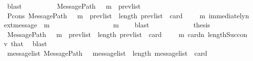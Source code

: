 \begin{isabellebody}
\ blast\isanewline
\ \ \ \ \ \ \ \ \isamarkupfalse%
\ {\isachardoublequoteopen}MessagePath\ {\isasymsigma}\ {\isasymsigma}{\isacharprime}\ {\isacharparenleft}m\ {\isacharhash}\ prev{\isacharunderscore}list{\isacharparenright}{\isachardoublequoteclose}\isanewline
\ \ \ \ \ \ \ \ \ \ \isamarkupfalse%
\ P{\isacharunderscore}cons\ {\isacartoucheopen}MessagePath\ {\isacharparenleft}{\isasymsigma}\ {\isasymunion}\ {\isacharbraceleft}m{\isacharbraceright}{\isacharparenright}\ {\isasymsigma}{\isacharprime}\ prev{\isacharunderscore}list\ {\isasymand}\ length\ prev{\isacharunderscore}list\ {\isacharequal}\ card\ {\isacharparenleft}{\isasymsigma}{\isacharprime}\ {\isacharminus}\ {\isacharparenleft}{\isasymsigma}\ {\isasymunion}\ {\isacharbraceleft}m{\isacharbraceright}{\isacharparenright}{\isacharparenright}{\isacartoucheclose}\ {\isacartoucheopen}immediately{\isacharunderscore}next{\isacharunderscore}message\ {\isacharparenleft}{\isasymsigma}{\isacharcomma}\ m{\isacharparenright}{\isacartoucheclose}\isanewline
\ \ \ \ \ \ \ \ \ \ \ \ \ \ \ \ {\isacartoucheopen}{\isasymsigma}\ {\isasymunion}\ {\isacharbraceleft}m{\isacharbraceright}\ {\isasymin}\ {\isasymSigma}{\isacartoucheclose}\ \isamarkupfalse%
\ blast\ \isanewline
\ \ \ \ \ \ \ \ \isamarkupfalse%
\ \isamarkupfalse%
\ {\isacharquery}thesis\isanewline
\ \ \ \ \ \ \ \ \ \ \isamarkupfalse%
\ {\isacartoucheopen}MessagePath\ {\isacharparenleft}{\isasymsigma}\ {\isasymunion}\ {\isacharbraceleft}m{\isacharbraceright}{\isacharparenright}\ {\isasymsigma}{\isacharprime}\ prev{\isacharunderscore}list\ {\isasymand}\ length\ prev{\isacharunderscore}list\ {\isacharequal}\ card\ {\isacharparenleft}{\isasymsigma}{\isacharprime}\ {\isacharminus}\ {\isacharparenleft}{\isasymsigma}\ {\isasymunion}\ {\isacharbraceleft}m{\isacharbraceright}{\isacharparenright}{\isacharparenright}{\isacartoucheclose}\ cardn\ length{\isacharunderscore}Suc{\isacharunderscore}conv\ that\ \isamarkupfalse%
\ blast\isanewline
\ \ \ \ \ \ \isamarkupfalse%
\isanewline
\isanewline
\ \ \ \ \ \ \isamarkupfalse%
\ \isamarkupfalse%
\ {\isachardoublequoteopen}{\isasymexists}message{\isacharunderscore}list{\isachardot}\ MessagePath\ {\isasymsigma}\ {\isasymsigma}{\isacharprime}\ message{\isacharunderscore}list\ {\isasymand}\ length\ message{\isacharunderscore}list\ {\isacharequal}\ card\ {\isacharparenleft}{\isasymsigma}{\isacharprime}\ {\isacharminus}\ {\isasymsigma}{\isacharparenright}{\isachardoublequoteclose}\isanewline

\end{isabellebody}
